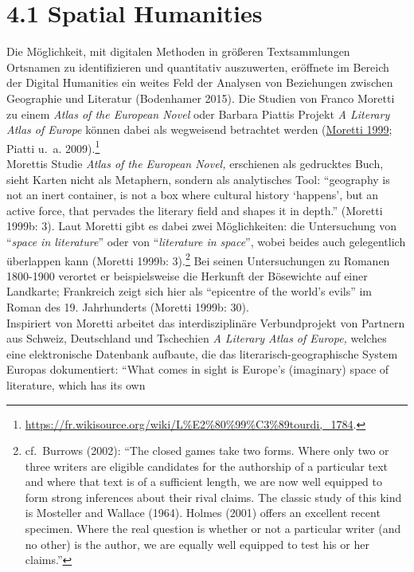 \documentclass[
  12pt,
  letterpaper,
  DIV=11,
  numbers=noendperiod]{scrreprt}
\begin{document}
\section{4.1 Spatial Humanities}\label{spatial-humanities}

Die Möglichkeit, mit digitalen Methoden in größeren Textsammlungen
Ortsnamen zu identifizieren und quantitativ auszuwerten, eröffnete im
Bereich der Digital Humanities ein weites Feld der Analysen von
Beziehungen zwischen Geographie und Literatur (Bodenhamer 2015). Die
Studien von Franco Moretti zu einem \emph{Atlas of the European Novel}
oder Barbara Piattis Projekt \emph{A Literary Atlas of Europe} können
dabei als wegweisend betrachtet werden
(\href{https://www.zotero.org/google-docs/?broken=1gBVjG}{Moretti 1999};
Piatti u.~a. 2009).\footnote{\url{https://fr.wikisource.org/wiki/L\%E2\%80\%99\%C3\%89tourdi,_1784}.}\\
Morettis Studie \emph{Atlas of the European Novel,} erschienen als
gedrucktes Buch, sieht Karten nicht als Metaphern, sondern als
analytisches Tool: ``geography is not an inert container, is not a box
where cultural history `happens', but an active force, that pervades the
literary field and shapes it in depth.'' (Moretti 1999b: 3). Laut
Moretti gibt es dabei zwei Möglichkeiten: die Untersuchung von
``\emph{space in literature}'' oder von ``\emph{literature in space}'',
wobei beides auch gelegentlich überlappen kann (Moretti 1999b:
3).\footnote{cf.~Burrows (2002): ``The closed games take two forms.
  Where only two or three writers are eligible candidates for the
  authorship of a particular text and where that text is of a sufficient
  length, we are now well equipped to form strong inferences about their
  rival claims. The classic study of this kind is Mosteller and Wallace
  (1964). Holmes (2001) offers an excellent recent specimen. Where the
  real question is whether or not a particular writer (and no other) is
  the author, we are equally well equipped to test his or her claims.''}
Bei seinen Untersuchungen zu Romanen 1800-1900 verortet er
beispielsweise die Herkunft der Bösewichte auf einer Landkarte;
Frankreich zeigt sich hier als ``epicentre of the world's evils'' im
Roman des 19. Jahrhunderts (Moretti 1999b: 30).\\
Inspiriert von Moretti arbeitet das interdisziplinäre Verbundprojekt von
Partnern aus Schweiz, Deutschland und Tschechien \emph{A Literary Atlas
of Europe,} welches eine elektronische Datenbank aufbaute, die das
literarisch-geographische System Europas dokumentiert: ``What comes in
sight is Europe's (imaginary) space of literature, which has its own
\end{document}
